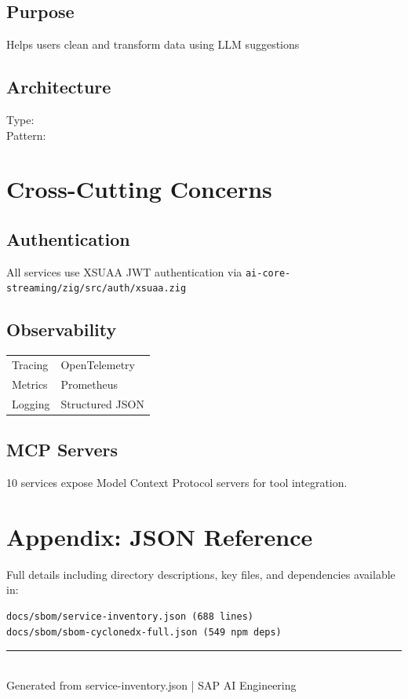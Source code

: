 \documentclass[11pt,a4paper]{article}
\begin{document}
\subsection{Purpose}
Helps users clean and transform data using LLM suggestions

\subsection{Architecture}
Type:  \\
Pattern: 



\newpage


\section{Cross-Cutting Concerns}

\subsection{Authentication}
All services use XSUAA JWT authentication via \texttt{ai-core-streaming/zig/src/auth/xsuaa.zig}

\subsection{Observability}
\begin{tabular}{ll}
\toprule
Tracing & OpenTelemetry \\
Metrics & Prometheus \\
Logging & Structured JSON \\
\bottomrule
\end{tabular}

\subsection{MCP Servers}
10 services expose Model Context Protocol servers for tool integration.

\section{Appendix: JSON Reference}

Full details including directory descriptions, key files, and dependencies available in:
\begin{lstlisting}
docs/sbom/service-inventory.json (688 lines)
docs/sbom/sbom-cyclonedx-full.json (549 npm deps)
\end{lstlisting}

\vfill
\begin{center}
\textcolor{sapblue}{\rule{0.8\textwidth}{0.4pt}}\\[0.3cm]
{\small Generated from service-inventory.json | SAP AI Engineering}
\end{center}
\end{document}
